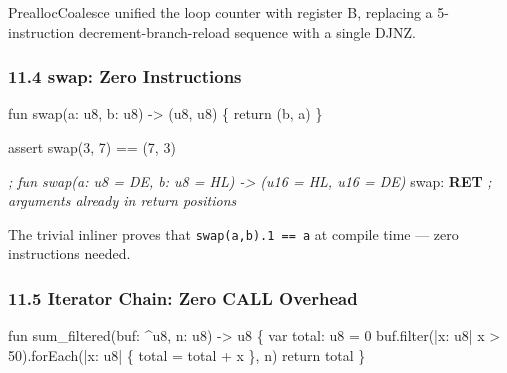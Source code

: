 \documentclass[
  11pt,
]{article}
\newenvironment{Shaded}{}{}
\newcommand{\CommentTok}[1]{\textcolor[rgb]{0.38,0.63,0.69}{\textit{#1}}}
\newcommand{\ControlFlowTok}[1]{\textcolor[rgb]{0.00,0.44,0.13}{\textbf{#1}}}
\newcommand{\FunctionTok}[1]{\textcolor[rgb]{0.02,0.16,0.49}{#1}}
\newcommand{\NormalTok}[1]{#1}
\begin{document}
PreallocCoalesce unified the loop counter with register B, replacing a
5-instruction decrement-branch-reload sequence with a single DJNZ.

\subsubsection{11.4 swap: Zero
Instructions}\label{swap-zero-instructions}

\begin{Shaded}
\begin{Highlighting}[]
\NormalTok{fun swap(a: u8, b: u8) {-}\textgreater{} (u8, u8) \{ return (b, a) \}}

\NormalTok{assert swap(3, 7) == (7, 3)}
\end{Highlighting}
\end{Shaded}

\begin{Shaded}
\begin{Highlighting}[]
\CommentTok{; fun swap(a: u8 = DE, b: u8 = HL) {-}\textgreater{} (u16 = HL, u16 = DE)}
\FunctionTok{swap:}
    \ControlFlowTok{RET}         \CommentTok{; arguments already in return positions}
\end{Highlighting}
\end{Shaded}

The trivial inliner proves that \texttt{swap(a,b).1\ ==\ a} at compile
time --- zero instructions needed.

\subsubsection{11.5 Iterator Chain: Zero CALL
Overhead}\label{iterator-chain-zero-call-overhead}

\begin{Shaded}
\begin{Highlighting}[]
\NormalTok{fun sum\_filtered(buf: \^{}u8, n: u8) {-}\textgreater{} u8 \{}
\NormalTok{    var total: u8 = 0}
\NormalTok{    buf.filter(|x: u8| x \textgreater{} 50).forEach(|x: u8| \{ total = total + x \}, n)}
\NormalTok{    return total}
\NormalTok{\}}
\end{Highlighting}
\end{Shaded}
\end{document}
